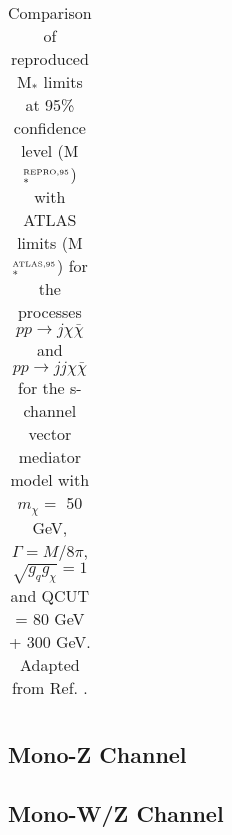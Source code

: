 \begin{flushleft}
\begin{table}[!htbp]
\begin{tabular}{c|c|c|c}
 \hline
 \hline
\end{tabular}
\caption{Comparison of reproduced M$_{*}$ limits at 95\% confidence level (M$_{*}^{\mbox{\tiny REPRO,95}}$) with ATLAS limits (M$_{*}^{\mbox{\tiny ATLAS,95}}$) for the processes $pp \rightarrow j\chi\bar{\chi}$ and $pp \rightarrow jj\chi\bar{\chi}$ for the s-channel vector mediator model with $m_{\chi} = $ 50 GeV, $\Gamma = M/8\pi$, $\sqrt{g_{q}g_{\chi}} = 1$ and QCUT = 80 GeV + 300 GeV. Adapted from Ref. \cite{Aad:2015zva}.}
\label{M_star_limits_monojet}
\end{table}
\end{flushleft}

\subsection{Mono-Z Channel}
\label{monoZ_validation}
\begin{flushleft}
\end{flushleft}

\subsection{Mono-W/Z Channel}
\label{monoWZ_validation}
\begin{flushleft}
\end{flushleft}
